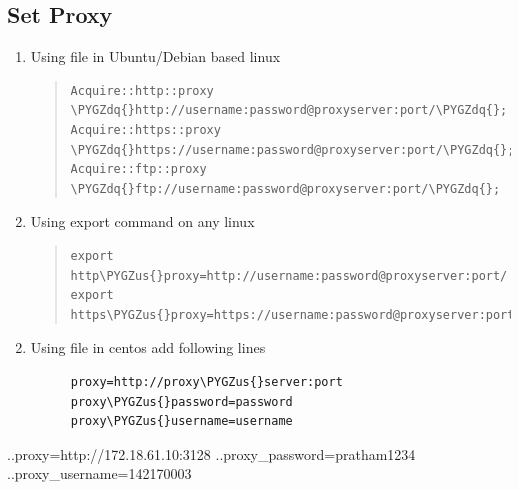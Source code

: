 \documentclass[letterpaper,10pt,english]{sphinxmanual}
\def\PYGZus{\char`\_}
\def\PYGZdq{\char`\"}
\begin{document}
\subsection{Set Proxy}
\label{_source/things/proxy_linux:set-proxy}\begin{enumerate}
\item {} 
Using file  in Ubuntu/Debian based linux
\begin{quote}

\begin{Verbatim}[commandchars=\\\{\}]
Acquire::http::proxy \PYGZdq{}http://username:password@proxyserver:port/\PYGZdq{};
Acquire::https::proxy \PYGZdq{}https://username:password@proxyserver:port/\PYGZdq{};
Acquire::ftp::proxy \PYGZdq{}ftp://username:password@proxyserver:port/\PYGZdq{};
\end{Verbatim}
\end{quote}

\item {} 
Using export command on any linux
\begin{quote}

\begin{Verbatim}[commandchars=\\\{\}]
export http\PYGZus{}proxy=http://username:password@proxyserver:port/
export https\PYGZus{}proxy=https://username:password@proxyserver:port/
\end{Verbatim}
\end{quote}

\end{enumerate}
\begin{enumerate}
\setcounter{enumi}{1}
\item {} \begin{description}
\item[{Using file  in centos add following lines}] \leavevmode
\begin{Verbatim}[commandchars=\\\{\}]
proxy=http://proxy\PYGZus{}server:port
proxy\PYGZus{}password=password
proxy\PYGZus{}username=username
\end{Verbatim}

\end{description}

\end{enumerate}

..proxy=http://172.18.61.10:3128
..proxy\_password=pratham1234
..proxy\_username=142170003
\end{document}
